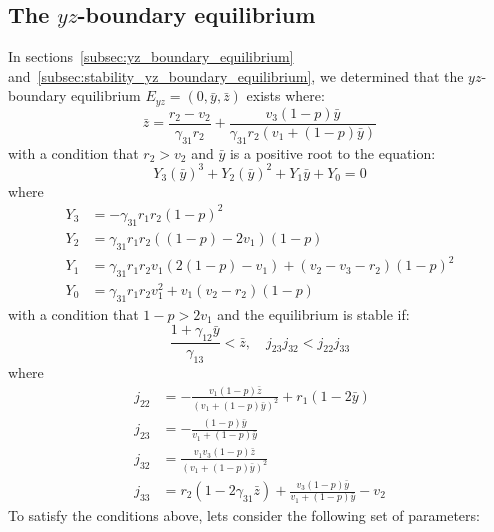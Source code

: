 \subsection{The $yz$-boundary equilibrium}\label{subsec:numsim_yz_boundary_equilibrium}
In sections~\ref{subsec:yz_boundary_equilibrium} and~\ref{subsec:stability_yz_boundary_equilibrium}, we determined that the $yz$-boundary equilibrium $E_{yz}=\left(0,\bar{y},\bar{z}\right)$ exists where:
\[
\bar{z}=\frac{r_2-v_2}{\gamma_{31}r_2}+\frac{v_3\left(1-p\right)\bar{y}}{\gamma_{31}r_2\left(v_1+\left(1-p\right)\bar{y}\right)}
\]
with a condition that $r_2>v_2$ and $\bar{y}$ is a positive root to the equation:
\begin{equation*}
    Y_3\left(\bar{y}\right)^3+Y_2\left(\bar{y}\right)^2+Y_1\bar{y}+Y_0=0
\end{equation*}
where
\begin{align*}
    Y_3 &= -\gamma_{31}r_1r_2\left(1-p\right)^2\\
    Y_2 &= \gamma_{31}r_1r_2\left(\left(1-p\right)-2v_1\right)\left(1-p\right)\\
    Y_1 &= \gamma_{31}r_1r_2v_1\left(2\left(1-p\right)-v_1\right)+\left(v_2-v_3-r_2\right)\left(1-p\right)^2\\
    Y_0 &= \gamma_{31}r_1r_2v_1^2+v_1\left(v_2-r_2\right)\left(1-p\right)
\end{align*}
with a condition that $1-p>2v_1$ and the equilibrium is stable if:
\[
\frac{1+\gamma_{12}\bar{y}}{\gamma_{13}}<\bar{z},\quad 
j_{23}j_{32}<j_{22}j_{33}
\]
where
\begin{align*}
    j_{22} &= -\frac{v_1\left(1-p\right)\bar{z}}{\left(v_1+\left(1-p\right)\bar{y}\right)^2}+r_1\left(1-2\bar{y}\right)\\
    j_{23} &= -\frac{\left(1-p\right)\bar{y}}{v_1+\left(1-p\right)\bar{y}}\\
    j_{32} &= \frac{v_1v_3\left(1-p\right)\bar{z}}{\left(v_1+\left(1-p\right)\bar{y}\right)^2}\\
    j_{33} &= r_2\left(1-2\gamma_{31}\bar{z}\right)+\frac{v_3\left(1-p\right)\bar{y}}{v_1+\left(1-p\right)\bar{y}}-v_2
\end{align*}
To satisfy the conditions above, lets consider the following set of parameters:
